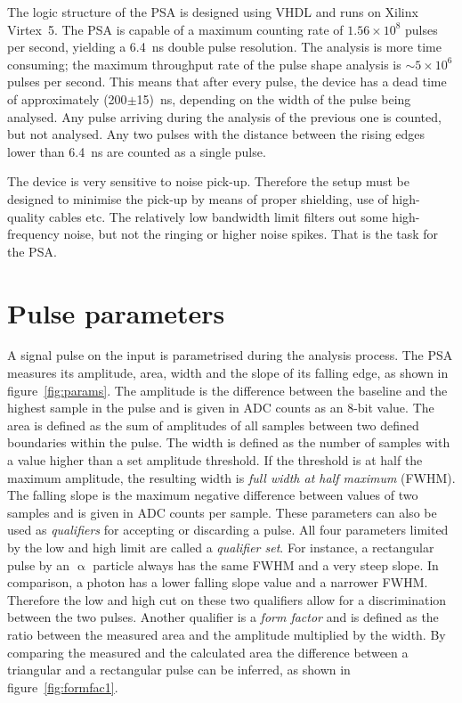 The logic structure of the PSA is designed using VHDL and runs on Xilinx Virtex~5. The PSA is capable of a maximum counting rate of $1.56\times10^8$ pulses per second, yielding a 6.4~ns double pulse resolution. The analysis is more time consuming; the maximum throughput rate of the pulse shape analysis is $\sim5\times10^6$ pulses per second. This means that after every pulse, the device has a dead time of approximately (200$\pm$15)~ns, depending on the width of the pulse being analysed. Any pulse arriving during the analysis of the previous one is counted, but not analysed. Any two pulses with the distance between the rising edges lower than 6.4~ns are counted as a single pulse.

The device is very sensitive to noise pick-up. Therefore the setup must be designed to minimise the pick-up by means of proper shielding, use of high-quality cables etc. The relatively low bandwidth limit filters out some high-frequency noise, but not the ringing or higher noise spikes. That is the task for the PSA.


\section{Pulse parameters}
A signal pulse on the input is parametrised during the analysis process. The PSA measures its amplitude, area, width and the slope of its falling edge, as shown in figure~\ref{fig:params}. The amplitude is the difference between the baseline and the highest sample in the pulse and is given in ADC counts as an 8-bit value. The area is defined as the sum of amplitudes of all samples between two defined boundaries within the pulse. The width is defined as the number of samples with a value higher than a set amplitude threshold. If the threshold is at half the maximum amplitude, the resulting width is \emph{full width at half maximum} (FWHM). The falling slope is the maximum negative difference between values of two samples and is given in ADC counts per sample. These parameters can also be used as \emph{qualifiers} for accepting or discarding a pulse. All four parameters limited by the low and high limit are called a \emph{qualifier set}. For instance, a rectangular pulse by an $\upalpha$ particle always has the same FWHM and a very steep slope. In comparison, a photon has a lower falling slope value and a narrower FWHM. Therefore the low and high cut on these two qualifiers allow for a discrimination between the two pulses. Another qualifier is a \emph{form factor} and is defined as the ratio between the measured area and the amplitude multiplied by the width. By comparing the measured and the calculated area the difference between a triangular and a rectangular pulse can be inferred, as shown in figure~\ref{fig:formfac1}.

